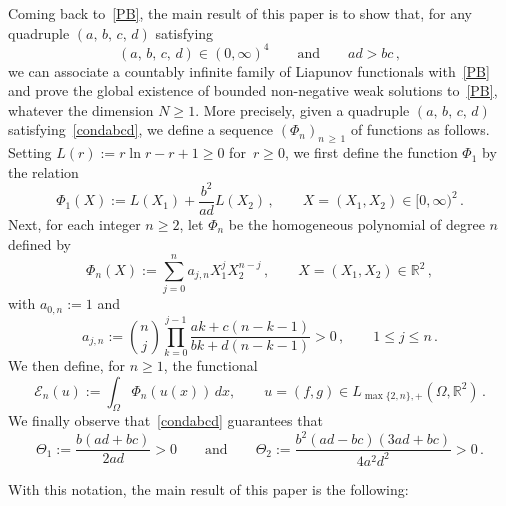\documentclass[10pt]{amsart}
\theoremstyle{definition}\newtheorem{defi}[theo]{Definition}\newtheorem{rema}[theo]{Remark}\newtheorem{exam}[theo]{Example}\newtheorem{exem}[theo]{Example}\newtheorem{nota}[theo]{Notation}
\newcommand{\bbR}{\mathbb{R}}
\newcommand{\clE}{\mathcal{E}}
\begin{document}
Coming back to~\eqref{PB}, the main result of this paper is to show that, for any quadruple $(a,\, b,\, c,\, d)$ satisfying
\begin{equation}\label{condabcd}
(a,\, b,\, c,\, d) \in(0,\infty)^4 \qquad\text{and}\qquad ad>bc\,,
\end{equation}
we can associate a countably infinite family of Liapunov functionals with~\eqref{PB} and prove the global existence of bounded non-negative weak solutions to~\eqref{PB}, whatever the dimension $N\ge 1$. More precisely, given a quadruple $(a,\, b,\, c,\, d)$ satisfying~\eqref{condabcd}, we define a sequence $(\Phi_n)_{n\,\ge\,1}$ of functions as follows. Setting $L(r):=r\ln{r}-r+1\ge 0$ for~$r\ge 0$, we first define the function $\Phi_1$ by the relation
\begin{equation}\label{p4d}
\Phi_1(X) := L(X_1) + \frac{b^2}{ad}L(X_2)\,, \qquad X=(X_1,X_2)\in [0,\infty)^2\,. 
\end{equation}
Next, for each integer $n\geq 2$, let $\Phi_n$ be the homogeneous polynomial of degree $n$ defined by
\begin{equation}\label{p4b}
\Phi_n(X) := \sum_{j=0}^n a_{j,n} X_1^j X_2^{n-j}\,, \qquad X=(X_1,X_2)\in \bbR^2\,, 
\end{equation}
with $a_{0,n}:=1$ and
\begin{equation}\label{p4c}
a_{j,n}:=\binom{n}{j} \prod_{k=0}^{j-1}\frac{ak+c(n-k-1)}{bk+d(n-k-1)}> 0\,,\qquad 1\leq j\leq n\,.
\end{equation}
We then define, for $n\ge 1$, the functional
\begin{equation}\label{p4}
\clE_n(u):=\int_{\Omega}\Phi_n(u(x))\, dx,\qquad u=(f,g)\in L_{\max\{2,n\},+}\left(\Omega,\bbR^2\right)\,.
\end{equation}
We finally observe that~\eqref{condabcd} guarantees that
\begin{equation}\label{constants}
\Theta_1:=\frac{b(ad+bc)}{2ad}>0\qquad\text{and}\qquad \Theta_2:=\frac{b^2(ad-bc)(3ad+bc)}{4a^2d^2}>0\,.
\end{equation}


With this notation, the main result of this paper is the following:
\end{document}
